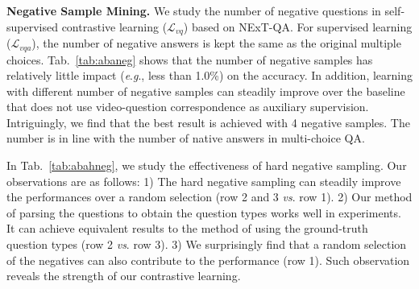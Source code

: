 \documentclass[10pt,journal,compsoc]{IEEEtran}
\newcommand{\vs}{\textit{vs}. }
\newcommand{\eg}{\textit{e}.\textit{g}.}
\begin{document}
\textbf{Negative Sample Mining.}
We study the number of negative questions in self-supervised contrastive learning ($\mathcal{L}_{vq}$) based on NExT-QA. For supervised learning ($\mathcal{L}_{vqa}$), the number of negative answers is kept the same as the original multiple choices. Tab.~\ref{tab:abaneg} shows that the number of negative samples has relatively little impact (\eg, less than 1.0\%) on the accuracy. In addition, learning with different number of negative samples can steadily improve over the baseline that does not use video-question correspondence as auxiliary supervision. Intriguingly, we find that the best result is achieved with 4 negative samples. The number is in line with the number of native answers in multi-choice QA. 
\setlength{\tabcolsep}{5pt}
\begin{table}[t!]
    \small
    \centering
    \caption{Study the number of negative questions in $\mathcal{L}_{vq}$.}
    \label{tab:abaneg}
    \vspace{-0.5em}
    \vspace{-0.4cm}
\end{table}

In Tab.~\ref{tab:abahneg}, we study the effectiveness of hard negative sampling. Our observations are as follows: 1) The hard negative sampling can steadily improve the performances over a random selection (row 2 and 3 \vs row 1). 2) Our method of parsing the questions to obtain the question types works well in experiments. It can achieve equivalent results to the method of using the ground-truth question types (row 2 \vs row 3). 3) We surprisingly find that a random selection of the negatives can also contribute to the performance (row 1). Such observation reveals the strength of our contrastive learning.
\setlength{\tabcolsep}{5pt}
\begin{table}[t!]
    \small
    \centering
    \caption{Study hard negative samples. Random: randomly sample the negatives. PQ: our method by parsing the questions. GT: use the ground-truth type annotations.}
    \label{tab:abahneg}
    \vspace{-0.5em}
\end{table}
\end{document}
